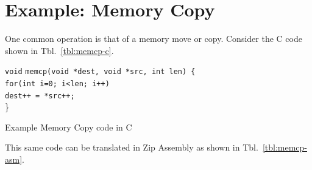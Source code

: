 \documentclass{gqtekspec}
\begin{document}
\section{Example: Memory Copy}
One common operation is that of a memory move or copy.  Consider the C code
shown in Tbl.~\ref{tbl:memcp-c}.
\begin{table}\begin{center}
\parbox{4in}{\begin{tabbing}
{\tt void} \= {\tt memcp(void *dest, void *src, int len) \{} \\
	\> {\tt for(int i=0; i<len; i++)} \\
	\> \hspace{0.2in} {\tt *dest++ = *src++;} \\
\}
\end{tabbing}}
\caption{Example Memory Copy code in C}\label{tbl:memcp-c}
\end{center}\end{table}
This same code can be translated in Zip Assembly as shown in
Tbl.~\ref{tbl:memcp-asm}.
\end{document}
